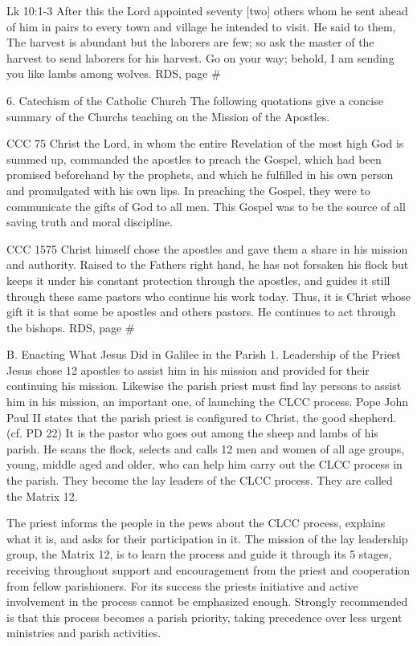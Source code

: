 \documentclass[oneside]{book}
\begin{document}
Lk 10:1-3 After this the Lord appointed seventy [two] others whom he sent ahead
of him in pairs to every town and village he intended to visit. He said to them,
The harvest is abundant but the laborers are few; so ask the master of the
harvest to send laborers for his harvest. Go on your way; behold, I am sending
you like lambs among wolves. RDS, page \#

6. Catechism of the Catholic Church The following quotations give a concise
summary of the Churchs teaching on the Mission of the Apostles.

CCC 75 Christ the Lord, in whom the entire Revelation of the most high God is
summed up, commanded the apostles to preach the Gospel, which had been promised
beforehand by the prophets, and which he fulfilled in his own person and
promulgated with his own lips. In preaching the Gospel, they were to communicate
the gifts of God to all men. This Gospel was to be the source of all saving
truth and moral discipline.

CCC 1575 Christ himself chose the apostles and gave them a share in his mission
and authority. Raised to the Fathers right hand, he has not forsaken his flock
but keeps it under his constant protection through the apostles, and guides it
still through these same pastors who continue his work today. Thus, it is Christ
whose gift it is that some be apostles and others pastors. He continues to act
through the bishops.  RDS, page \#


B. Enacting What Jesus Did in Galilee in the Parish 1. Leadership of the Priest
Jesus chose 12 apostles to assist him in his mission and provided for their
continuing his mission. Likewise the parish priest must find lay persons to
assist him in his mission, an important one, of launching the CLCC process. Pope
John Paul II states that the parish priest is configured to Christ, the good
shepherd. (cf. PD 22) It is the pastor who goes out among the sheep and lambs of
his parish. He scans the flock, selects and calls 12 men and women of all age
groups, young, middle aged and older, who can help him carry out the CLCC
process in the parish. They become the lay leaders of the CLCC process. They are
called the Matrix 12.

The priest informs the people in the pews about the CLCC process, explains what
it is, and asks for their participation in it. The mission of the lay leadership
group, the Matrix 12, is to learn the process and guide it through its 5 stages,
receiving throughout support and encouragement from the priest and cooperation
from fellow parishioners. For its success the priests initiative and active
involvement in the process cannot be emphasized enough. Strongly recommended is
that this process becomes a parish priority, taking precedence over less urgent
ministries and parish activities.
\end{document}

